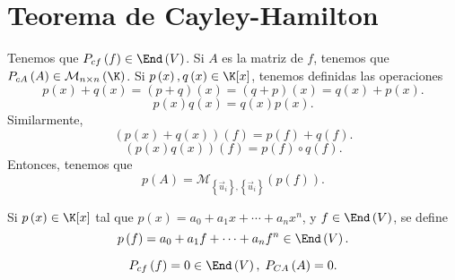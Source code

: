 \section{Teorema de Cayley-Hamilton}
Tenemos que $\displaystyle P_{cf}\left(f\right) \in \End\left(V\right)$. Si $\displaystyle A $ es la matriz de $\displaystyle f $, tenemos que $\displaystyle P_{cA}\left(A\right) \in \mathcal{M}_{n \times n}\left(\K\right) $. Si $\displaystyle p\left(x\right), q\left(x\right) \in \K[x] $, tenemos definidas las operaciones
\[p\left(x\right) + q\left(x\right) = \left(p + q\right)\left(x\right) = \left(q + p\right)\left(x\right) = q\left(x\right) + p\left(x\right) .\]
\[p\left(x\right)q\left(x\right) = q\left(x\right) p\left(x\right) .\]
Similarmente, 
\[\left(p\left(x\right)+q\left(x\right)\right)\left(f\right) = p\left(f\right) + q\left(f\right) .\]
\[\left(p\left(x\right)q\left(x\right)\right)\left(f\right) = p\left(f\right)\circ q\left(f\right) .\]
Entonces, tenemos que
\[p\left(A\right) = \mathcal{M}_{ \left\{ \vec{u}_{i}\right\} , \left\{ \vec{u}_{i}\right\} }\left(p\left(f\right)\right) .\]
\begin{observation}
	\normalfont Si $\displaystyle p\left(x\right) \in \K[x] $ tal que $\displaystyle p\left(x\right) = a_{0} + a_{1}x + \cdots + a_{n}x^{n} $, y $\displaystyle f \in \End\left(V\right)$, se define 
	\[p\left(f\right) = a_{0} + a_{1}f + \cdots + a_{n}f^{n} \in \End\left(V\right) .\]
\end{observation}
\begin{ftheorem}[]
\normalfont 
\[P_{cf}\left(f\right) = 0 \in \End\left(V\right), \; P_{CA}\left(A\right) = 0 .\]
\end{ftheorem}
